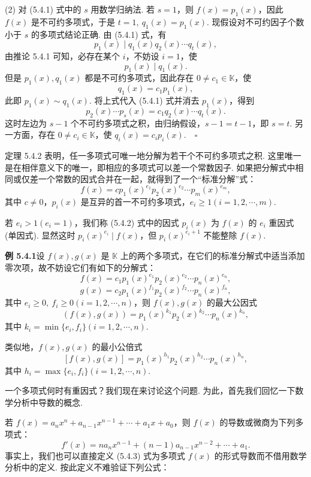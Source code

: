 \documentclass[UTF8,12pt,a4paper,fontset=fandol]{ctexart}
\begin{document}
(2) 对 (5.4.1) 式中的 $s$ 用数学归纳法. 若 $s=1$，则 $f(x)=p_1(x)$，因此 $f(x)$ 是不可约多项式，于是 $t=1,\ q_1(x)=p_1(x)$. 现假设对不可约因子个数小于 $s$ 的多项式结论正确. 由 (5.4.1) 式，有
\[
p_1(x)\mid q_1(x)q_2(x)\cdots q_t(x),
\]
由推论 5.4.1 可知，必存在某个 $i$，不妨设 $i=1$，使
\[
p_1(x)\mid q_1(x).
\]
但是 $p_1(x),q_1(x)$ 都是不可约多项式，因此存在 $0\neq c_1\in\mathbb{K}$，使
\[
q_1(x)=c_1p_1(x),
\]
此即 $p_1(x)\sim q_1(x)$. 将上式代入 (5.4.1) 式并消去 $p_1(x)$，得到
\[
p_2(x)\cdots p_s(x)=c_1q_2(x)\cdots q_t(x).
\]
这时左边为 $s-1$ 个不可约多项式之积，由归纳假设，$s-1=t-1$，即 $s=t$. 另一方面，存在 $0\neq c_i\in\mathbb{K}$，使 $q_i(x)=c_ip_i(x).\quad \square$

定理 5.4.2 表明，任一多项式可唯一地分解为若干个不可约多项式之积. 这里唯一是在相伴意义下的唯一，即相应的多项式可以差一个常数因子. 如果把分解式中相同或仅差一个常数的因式合并在一起，就得到了一个“标准分解”式：
\begin{equation}
f(x)=cp_1(x)^{e_1}p_2(x)^{e_2}\cdots p_m(x)^{e_m},
\tag{5.4.2}
\end{equation}
其中 $c\neq 0$，$p_i(x)$ 是互异的首一不可约多项式，$e_i\geq 1(i=1,2,\cdots,m)$.

若 $e_i>1(e_i=1)$，我们称 (5.4.2) 式中的因式 $p_i(x)$ 为 $f(x)$ 的 $e_i$ 重因式 (单因式). 显然这时 $p_i(x)^{e_i}\mid f(x)$，但 $p_i(x)^{e_i+1}$ 不能整除 $f(x)$.

\noindent\textbf{例 5.4.1}\quad 设 $f(x),g(x)$ 是 $\mathbb{K}$ 上的两个多项式，在它们的标准分解式中适当添加零次项，故不妨设它们有如下的分解式：
\[
f(x)=c_1p_1(x)^{e_1}p_2(x)^{e_2}\cdots p_n(x)^{e_n},
\]
\[
g(x)=c_2p_1(x)^{f_1}p_2(x)^{f_2}\cdots p_n(x)^{f_n},
\]
其中 $e_i\geq 0,\ f_i\geq 0(i=1,2,\cdots,n)$，则 $f(x),g(x)$ 的最大公因式
\[
(f(x),g(x))=p_1(x)^{k_1}p_2(x)^{k_2}\cdots p_n(x)^{k_n},
\]
其中 $k_i=\min\{e_i,f_i\}(i=1,2,\cdots,n)$.

类似地，$f(x),g(x)$ 的最小公倍式
\[
[f(x),g(x)]=p_1(x)^{h_1}p_2(x)^{h_2}\cdots p_n(x)^{h_n},
\]
其中 $h_i=\max\{e_i,f_i\}(i=1,2,\cdots,n)$.

一个多项式何时有重因式？我们现在来讨论这个问题. 为此，首先我们回忆一下数学分析中导数的概念.

若 $f(x)=a_nx^n+a_{n-1}x^{n-1}+\cdots+a_1x+a_0$，则 $f(x)$ 的导数或微商为下列多项式：
\begin{equation}
f'(x)=na_nx^{n-1}+(n-1)a_{n-1}x^{n-2}+\cdots+a_1.
\tag{5.4.3}
\end{equation}
事实上，我们也可以直接定义 (5.4.3) 式为多项式 $f(x)$ 的形式导数而不借用数学分析中的定义. 按此定义不难验证下列公式：
\end{document}
